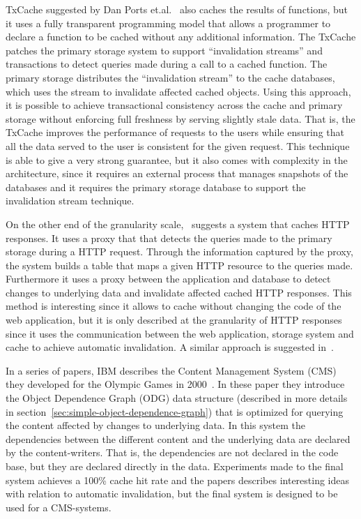 TxCache suggested by Dan Ports et.al.~\cite{paper:liskov} also caches the results of functions, but it uses a fully transparent programming model that allows a programmer to declare a function to be cached without any additional information. The TxCache patches the primary storage system to support ``invalidation streams'' and transactions to detect queries made during a call to a cached function. The primary storage distributes the ``invalidation stream'' to the cache databases, which uses the stream to invalidate affected cached objects. Using this approach, it is possible to achieve transactional consistency across the cache and primary storage without enforcing full freshness by serving slightly stale data. That is, the TxCache improves the performance of requests to the users while ensuring that all the data served to the user is consistent for the given request. This technique is able to give a very strong guarantee, but it also comes with complexity in the architecture, since it requires an external process that manages snapshots of the databases and it requires the primary storage database to support the invalidation stream technique.

On the other end of the granularity scale,~\cite{paper:db-driven-http} suggests a system that caches HTTP responses. It uses a proxy that that detects the queries made to the primary storage during a HTTP request. Through the information captured by the proxy, the system builds a table that maps a given HTTP resource to the queries made. Furthermore it uses a proxy between the application and database to detect changes to underlying data and invalidate affected cached HTTP responses. This method is interesting since it allows to cache without changing the code of the web application, but it is only described at the granularity of HTTP responses since it uses the communication between the web application, storage system and cache to achieve automatic invalidation. A similar approach is suggested in~\cite{paper:db-driven2}.

In a series of papers, IBM describes the Content Management System (CMS) they developed for the Olympic Games in 2000~\cite{paper:ibm, paper:ibm-extended, paper:ibm-publishing-system}. In these paper they introduce the Object Dependence Graph (ODG) data structure (described in more details in section~\ref{sec:simple-object-dependence-graph}) that is optimized for querying the content affected by changes to underlying data. In this system the dependencies between the different content and the underlying data are declared by the content-writers. That is, the dependencies are not declared in the code base, but they are declared directly in the data. Experiments made to the final system achieves a 100\% cache hit rate and the papers describes interesting ideas with relation to automatic invalidation, but the final system is designed to be used for a CMS-systems.

